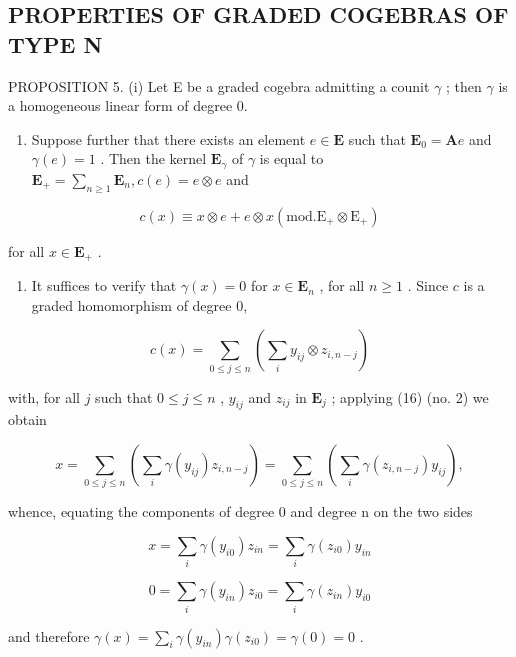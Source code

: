 \subsection{PROPERTIES OF GRADED COGEBRAS OF TYPE N}

PROPOSITION 5. (i) Let E be a graded cogebra admitting a counit \(\gamma\) ; then \(\gamma\) is a homogeneous linear form of degree 0.

\begin{enumerate}
\def\labelenumi{(\roman{enumi})}
\setcounter{enumi}{1}
\tightlist
\item
  Suppose further that there exists an element \(e \in \mathbf{E}\) such that \(\mathbf{E}_0 = \mathbf{A}e\) and \(\gamma(e) = 1\) . Then the kernel \(\mathbf{E}_{\gamma}\) of \(\gamma\) is equal to \(\mathbf{E}_{+} = \sum_{n \geqslant 1} \mathbf{E}_n, c(e) = e \otimes e\) and
\end{enumerate}

\[
c (x) \equiv x \otimes e + e \otimes x (\mathrm{mod.} \mathrm{E} _ {+} \otimes \mathrm{E} _ {+})\tag{19}
\]

for all \(x \in \mathbf{E}_{+}\) .

\begin{enumerate}
\def\labelenumi{(\roman{enumi})}
\tightlist
\item
  It suffices to verify that \(\gamma(x) = 0\) for \(x \in \mathbf{E}_n\) , for all \(n \geqslant 1\) . Since \(c\) is a graded homomorphism of degree 0,
\end{enumerate}

\[
c (x) = \sum_ {0 \leqslant j \leqslant n} \left(\sum_ {i} y _ {i j} \otimes z _ {i, n - j}\right)\tag{20}
\]

with, for all \(j\) such that \(0 \leqslant j \leqslant n\) , \(y_{ij}\) and \(z_{ij}\) in \(\mathbf{E}_j\) ; applying (16) (no. 2) we obtain

\[
x = \sum_ {0 \leqslant j \leqslant n} \left(\sum_ {i} \gamma (y _ {i j}) z _ {i, n - j}\right) = \sum_ {0 \leqslant j \leqslant n} \left(\sum_ {i} \gamma (z _ {i, n - j}) y _ {i j}\right),
\]

whence, equating the components of degree 0 and degree n on the two sides

\[
x = \sum_ {i} \gamma (y _ {i 0}) z _ {i n} = \sum_ {i} \gamma (z _ {i 0}) y _ {i n}
\]

\[
0 = \sum_ {i} \gamma (y _ {i n}) z _ {i 0} = \sum_ {i} \gamma (z _ {i n}) y _ {i 0}
\]

and therefore \(\gamma(x) = \sum_{i} \gamma(y_{in})\gamma(z_{i0}) = \gamma(0) = 0\) .

